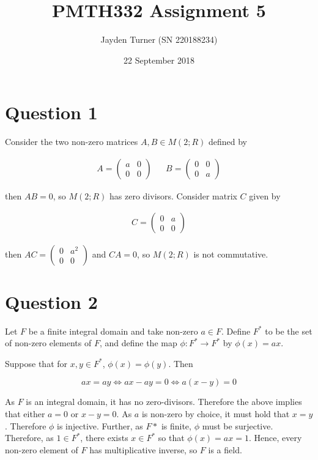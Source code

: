 \documentclass{article}
\title{PMTH332 Assignment 5}
\date{22 September 2018}
\author{Jayden Turner (SN 220188234)}
\begin{document}
\maketitle
{}

\section*{Question 1}

Consider the two non-zero matrices $A, B \in M(2; R)$ defined by

\begin{align*}
    A = \begin{pmatrix}
        a & 0\\
        0 & 0
    \end{pmatrix}
    &&
    B = \begin{pmatrix}
        0 & 0\\
        0 & a
    \end{pmatrix}
\end{align*}

then $AB = 0$, so $M(2; R)$ has zero divisors. Consider matrix $C$ given by

\begin{align*}
    C = \begin{pmatrix}
        0 & a\\
        0 & 0
    \end{pmatrix}
\end{align*}

then $AC = \begin{pmatrix}0 & a^2\\0 & 0\end{pmatrix}$ and $CA = 0$,
so $M(2; R)$ is not commutative.

\section*{Question 2}

Let $F$ be a finite integral domain and take non-zero $a \in F$. Define $F^*$
to be the set of non-zero elements of $F$, and define the map $\phi: F^* \to F^*$
by $\phi(x) = ax$.

\hfill\break
Suppose that for $x, y \in F^*$, $\phi(x) = \phi(y)$. Then

\begin{equation*}
    ax = ay \iff ax - ay = 0 \iff a(x - y) = 0
\end{equation*}

As $F$ is an integral domain, it has no zero-divisors. Therefore the above
implies that either $a = 0$ or $x - y = 0$. As $a$ is non-zero by choice,
it must hold that $x = y$. Therefore $\phi$ is injective. Further, as $F*$
is finite, $\phi$ must be surjective. Therefore, as $1 \in F^*$, there
exists $x \in F^*$ so that $\phi(x) = ax = 1$. Hence, every non-zero element
of $F$ has multiplicative inverse, so $F$ is a field.
\end{document}
